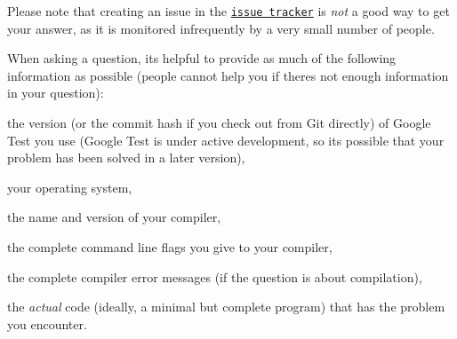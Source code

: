 Please note that creating an issue in the \href{https://github.com/google/googletest/issues}{\tt issue tracker} is {\itshape not} a good way to get your answer, as it is monitored infrequently by a very small number of people.

When asking a question, it\textquotesingle{}s helpful to provide as much of the following information as possible (people cannot help you if there\textquotesingle{}s not enough information in your question)\+:


\begin{DoxyItemize}
\item the version (or the commit hash if you check out from Git directly) of Google Test you use (Google Test is under active development, so it\textquotesingle{}s possible that your problem has been solved in a later version),
\item your operating system,
\item the name and version of your compiler,
\item the complete command line flags you give to your compiler,
\item the complete compiler error messages (if the question is about compilation),
\item the {\itshape actual} code (ideally, a minimal but complete program) that has the problem you encounter. 
\end{DoxyItemize}